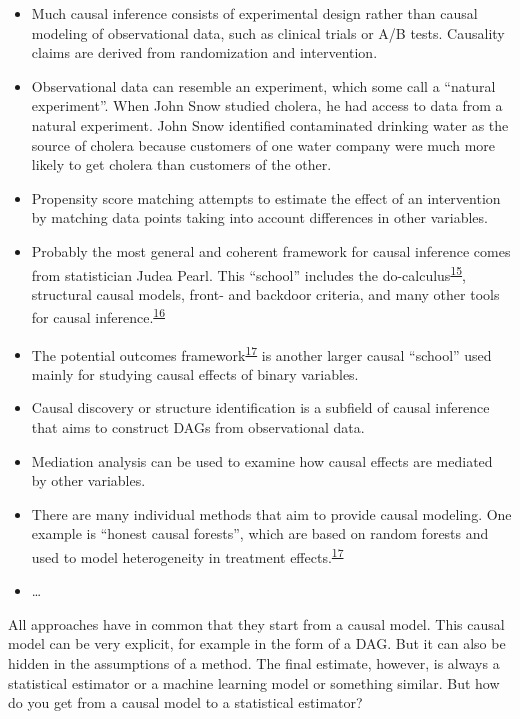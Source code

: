\documentclass[
  10pt,
]{scrbook}
\providecommand{\tightlist}{%
  \setlength{\itemsep}{0pt}\setlength{\parskip}{0pt}}
\begin{document}
\begin{itemize}
\tightlist
\item
  Much causal inference consists of experimental design rather than causal modeling of observational data, such as clinical trials or A/B tests. Causality claims are derived from randomization and intervention.
\item
  Observational data can resemble an experiment, which some call a ``natural experiment''. When John Snow studied cholera, he had access to data from a natural experiment. John Snow identified contaminated drinking water as the source of cholera because customers of one water company were much more likely to get cholera than customers of the other.
\item
  Propensity score matching attempts to estimate the effect of an intervention by matching data points taking into account differences in other variables.
\item
  Probably the most general and coherent framework for causal inference comes from statistician Judea Pearl. This ``school'' includes the do-calculus\textsuperscript{\protect\hyperlink{ref-pearl2012calculus}{15}}, structural causal models, front- and backdoor criteria, and many other tools for causal inference.\textsuperscript{\protect\hyperlink{ref-pearl2009causal}{16}}
\item
  The potential outcomes framework\textsuperscript{\protect\hyperlink{ref-athey2016recursive}{17}} is another larger causal ``school'' used mainly for studying causal effects of binary variables.
\item
  Causal discovery or structure identification is a subfield of causal inference that aims to construct DAGs from observational data.
\item
  Mediation analysis can be used to examine how causal effects are mediated by other variables.
\item
  There are many individual methods that aim to provide causal modeling. One example is ``honest causal forests'', which are based on random forests and used to model heterogeneity in treatment effects.\textsuperscript{\protect\hyperlink{ref-athey2016recursive}{17}}
\item
  \ldots{}
\end{itemize}

All approaches have in common that they start from a causal model.
This causal model can be very explicit, for example in the form of a DAG.
But it can also be hidden in the assumptions of a method.
The final estimate, however, is always a statistical estimator or a machine learning model or something similar.
But how do you get from a causal model to a statistical estimator?
\end{document}
